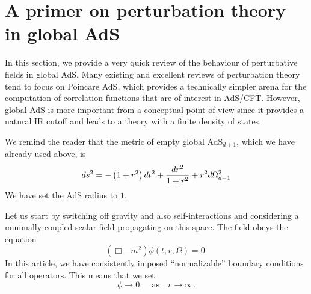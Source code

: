\documentclass[12pt]{article}
\newcommand{\be}{\begin{equation}}
\newcommand{\ee}{\end{equation}}
\begin{document}
  













\section{A primer on perturbation theory in global AdS \label{appadspert}}
In this section, we provide a very quick review of the behaviour of perturbative fields in global AdS. Many existing and excellent reviews of perturbation theory \cite{Aharony:1999ti,D'Hoker:2002aw} tend to focus on Poincare AdS, which provides a technically simpler arena for the computation of correlation functions that are of interest in AdS/CFT. However, global AdS is more important from a conceptual point of view since it provides a natural IR cutoff and leads to a theory with a finite density of states.

We remind the reader that the metric of empty global AdS$_{d+1}$, which we have already used above, is
\be
\label{emptyglobaladsapp}
ds^2 = -\left(1+r^2\right) dt^2 
+{ dr^2 \over 1+r^2} + r^2 d\Omega_{d-1}^2 
\ee
We have set the AdS radius to $1$.

Let us start by switching off gravity and also self-interactions and considering a minimally coupled scalar field propagating on this space. The field obeys the equation
\be
\left( \Box - m^2 \right) \phi(t, r, \Omega) = 0.
\ee
In this article, we have consistently imposed ``normalizable'' boundary conditions for all operators. This means that we set 
\be
\label{boundcond}
\phi \rightarrow 0, \quad \text{as} \quad r \rightarrow \infty.
\ee
\end{document}
